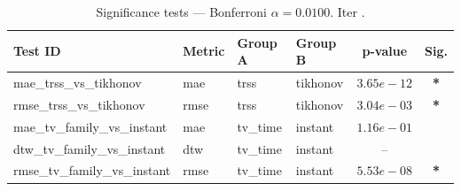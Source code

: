 ﻿%
\begin{table}[ht]
\centering
\caption[EEG reconstruction - Iteration it14]{Significance tests — Bonferroni $\alpha=0.0100$. Iter .}
\label{tab:sig_it14_low_missing_synthetic}
\small
\begin{tabular}{llllcc}
\toprule
Test ID & Metric & Group A & Group B & p-value & Sig. \\
\midrule
mae\_trss\_vs\_tikhonov & mae & trss & tikhonov & $3.65e-12$ & \textbf{*} \\
rmse\_trss\_vs\_tikhonov & rmse & trss & tikhonov & $3.04e-03$ & \textbf{*} \\
mae\_tv\_family\_vs\_instant & mae & tv\_time & instant & $1.16e-01$ &  \\
dtw\_tv\_family\_vs\_instant & dtw & tv\_time & instant & -- &  \\
rmse\_tv\_family\_vs\_instant & rmse & tv\_time & instant & $5.53e-08$ & \textbf{*} \\
\bottomrule
\end{tabular}
\end{table}







